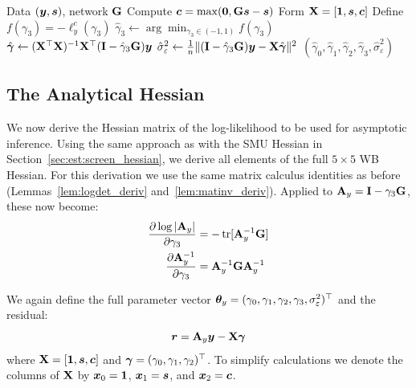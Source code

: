 \begin{algorithm}[H]
\caption[ML Estimation of WB Equation]{ML Estimation of WB Equation.}
\label{alg:wb_ml}
\begin{algorithmic}[1]
\Require Data $(\bm{y}, \bm{s})$, network $\mathbf{G}$
\State Compute $\bm{c} = \max(\bm{0}, \mathbf{G}\bm{s} - \bm{s})$ 
\State Form $\mathbf{X} = [\bm{1}, \bm{s}, \bm{c}]$
\State Define $f(\gamma_3) = -\ell_y^c(\gamma_3)$ 
\State $\hat\gamma_3 \gets \arg\min_{\gamma_3 \in (-1, 1)} f(\gamma_3)$ 
\State $\hat{\bm{\gamma}} \gets (\mathbf{X}^\top\mathbf{X})^{-1}\mathbf{X}^\top
    (\mathbf{I} - \hat\gamma_3\mathbf{G})\bm{y}$ 
\State $\hat\sigma_\varepsilon^2 \gets \frac{1}{n}\|(\mathbf{I} - \hat\gamma_3\mathbf{G})\bm{y}
    - \mathbf{X}\hat{\bm{\gamma}}\|^2$
\State \Return $(\hat\gamma_0, \hat\gamma_1, \hat\gamma_2, \hat\gamma_3,
    \hat\sigma_\varepsilon^2)$
\end{algorithmic}
\end{algorithm}

\subsection{The Analytical Hessian}
\label{sec:est:wb_hessian}
We now derive the Hessian matrix of the log-likelihood to be used for asymptotic inference. Using the same approach as with the SMU Hessian in Section~\ref{sec:est:screen_hessian}, we derive all elements of the full $5 \times 5$ WB Hessian. For this derivation we use the same matrix calculus identities as before (Lemmas~\ref{lem:logdet_deriv} and~\ref{lem:matinv_deriv}). Applied to $\mathbf{A}_y = \mathbf{I} - \gamma_3\mathbf{G}$, these now become:
\begin{align}
    \frac{\partial \log|\mathbf{A}_y|}{\partial \gamma_3} &= -\operatorname{tr}[\mathbf{A}_y^{-1}\mathbf{G}] \label{eq:logdet_wb_applied} \\
    \frac{\partial \mathbf{A}_y^{-1}}{\partial \gamma_3} &= \mathbf{A}_y^{-1}\mathbf{G}\mathbf{A}_y^{-1} \label{eq:matinv_wb_applied}
\end{align}

We again define the full parameter vector $\bm{\theta}_y = (\gamma_0, \gamma_1, \gamma_2, \gamma_3, \sigma_\varepsilon^2)^\top$
and the residual:
\begin{equation}
    \bm{r} = \mathbf{A}_y\bm{y} - \mathbf{X}\bm{\gamma}
\end{equation}
where $\mathbf{X} = [\bm{1}, \bm{s}, \bm{c}]$ and $\bm{\gamma} = (\gamma_0, \gamma_1, \gamma_2)^\top$. To simplify calculations we denote the columns of $\mathbf{X}$ by $\bm{x}_0 = \bm{1}$, $\bm{x}_1 = \bm{s}$, and $\bm{x}_2 = \bm{c}$.

